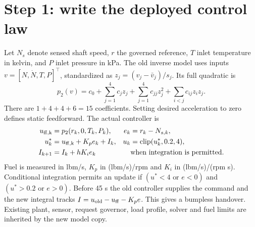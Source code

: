 \documentclass[11pt,a4paper]{article}
\begin{document}
\section{Step 1: write the deployed control law}
Let $N_s$ denote sensed shaft speed, $r$ the governed reference, $T$ inlet temperature in kelvin, and $P$ inlet pressure in kPa. The old inverse model uses inputs $v=[N,\dot N,T,P]^\top$, standardized as $z_j=(v_j-\bar v_j)/s_j$. Its full quadratic is
\begin{equation}
 p_2(v)=c_0+\sum_{j=1}^4c_jz_j+\sum_{j=1}^4c_{jj}z_j^2+\sum_{i<j}c_{ij}z_iz_j.
\end{equation}
There are $1+4+4+6=15$ coefficients. Setting desired acceleration to zero defines static feedforward. The actual controller is
\begin{align}
 u_{\rm ff,k}&=p_2(r_k,0,T_k,P_k), &e_k&=r_k-N_{s,k},\\
 u_k^*&=u_{\rm ff,k}+K_pe_k+I_k, &u_k&=\operatorname{clip}(u_k^*,0.2,4),\\
 I_{k+1}&=I_k+hK_ie_k &&\text{when integration is permitted.}
\end{align}
Fuel is measured in lbm/s, $K_p$ in (lbm/s)/rpm and $K_i$ in (lbm/s)/(rpm s). Conditional integration permits an update if $(u^*<4\text{ or }e<0)$ and $(u^*>0.2\text{ or }e>0)$. Before 45 s the old controller supplies the command and the new integral tracks $I=u_{\rm old}-u_{\rm ff}-K_pe$. This gives a bumpless handover. Existing plant, sensor, request governor, load profile, solver and fuel limits are inherited by the new model copy.
\end{document}
